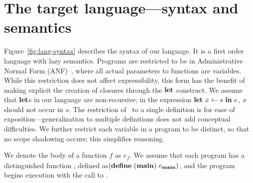 \documentclass[9pt,preprint,nonatbib]{sigplanconf}
\begin{document}
\section{The target language---syntax and semantics}
\label{sec:defs}
Figure~\ref{fig:lang-syntax} describes the syntax  of our language. It
is a first order language with lazy semantics. Programs are restricted
to        be        in        Administrative        Normal        Form
(ANF)~\cite{chakravarty03perspective}, where  all actual  parameters to
functions  are  variables.  While  this  restriction  does not  affect
expressibility,  this form  has  the benefit  of  making explicit  the
creation of closures through the $\mbox{$\mathbf{ let}$}$ construct.   We
  assume that  $\mbox{$\mathbf{ let}$}$s  in  our  language  are  non-recursive;  in  the
  expression $\mbox{$\mathbf{ let}$}\,\, x  \leftarrow s\,\, \mbox{$\mathbf{ in}$}\,\, e$,  $x$ should not
  occur in  $s$. The restriction of  \LET\ to a single  definition is
for ease  of exposition---generalization to multiple  definitions does
not add conceptual difficulties.  We further restrict each variable in
a program  to be  distinct, so that  no scope  shadowing occurs; this
simplifies reasoning.


We denote the body of a function ${\mathit  f}$   as $e_{\mathit f}$.
 We assume that each program has a distinguished function
\mainpgm,    defined as\linebreak    $(\mbox{$\mathbf{define}$}\      ({\tt
  \mathbf{main}})\  e_{\mathbf{main}})$,  and  the program begins execution
with the call to \mainpgm.  
\end{document}

